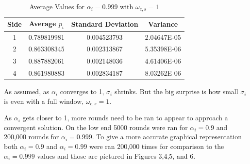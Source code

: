 \documentclass{article}
\begin{document}
\begin{table}[h!]
\centering
\caption{Average Values for $\alpha_i = 0.999$ with $\omega_{c,s} = 1$}
\label{tab:table1}
\begin{tabular}{|c|c|c|c|}
\hline
Side & Average $p_i$ & Standard Deviation & Variance\\
\hline
1 & 0.789819981 & 0.004523793 & 2.04647E-05\\
2 & 0.863308345 & 0.002313867 & 5.35398E-06\\
3 & 0.887882061 & 0.002148036 & 4.61406E-06\\
4 & 0.861980883 & 0.002834187 & 8.03262E-06\\
\hline
\end{tabular}
\end{table}

As assumed, as $\alpha_i$ converges to 1, $\sigma_i$ shrinks.  But the big surprise is how small $\sigma_i$ is even with a full window, $\omega_{c,s} = 1$.

As $\alpha_i$ gets closer to 1, more rounds need to be ran to appear to approach a convergent solution.  On the low end 5000 rounds were ran for $\alpha_i = 0.9$ and 200,000 rounds for $\alpha_i = 0.999$.  To give a more accurate graphical representation both $\alpha_i = 0.9$ and $\alpha_i = 0.99$ were ran 200,000 times for comparison to the $\alpha_i = 0.999$ values and those are pictured in Figures 3,4,5, and 6.
\end{document}
